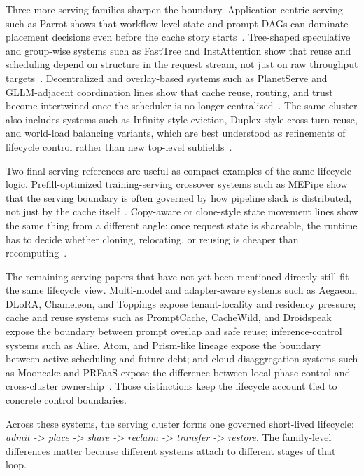 Three more serving families sharpen the boundary. Application-centric serving such as Parrot shows that workflow-level state and prompt DAGs can dominate placement decisions even before the cache story starts~\cite{lin2024parrot}. Tree-shaped speculative and group-wise systems such as FastTree and InstAttention show that reuse and scheduling depend on structure in the request stream, not just on raw throughput targets~\cite{pan2025fasttree,pan2025instattention}. Decentralized and overlay-based systems such as PlanetServe and GLLM-adjacent coordination lines show that cache reuse, routing, and trust become intertwined once the scheduler is no longer centralized~\cite{fang2026planetserve}. The same cluster also includes systems such as Infinity-style eviction, Duplex-style cross-turn reuse, and world-load balancing variants, which are best understood as refinements of lifecycle control rather than new top-level subfields~\cite{infinigen2024,yun2024duplex,wang2025wlbllm}.

Two final serving references are useful as compact examples of the same lifecycle logic. Prefill-optimized training-serving crossover systems such as MEPipe show that the serving boundary is often governed by how pipeline slack is distributed, not just by the cache itself~\cite{sun2025mepipe}. Copy-aware or clone-style state movement lines show the same thing from a different angle: once request state is shareable, the runtime has to decide whether cloning, relocating, or reusing is cheaper than recomputing~\cite{tian2025clone}.

The remaining serving papers that have not yet been mentioned directly still fit the same lifecycle view. Multi-model and adapter-aware systems such as Aegaeon, DLoRA, Chameleon, and Toppings expose tenant-locality and residency pressure; cache and reuse systems such as PromptCache, CacheWild, and Droidspeak expose the boundary between prompt overlap and safe reuse; inference-control systems such as Alise, Atom, and Prism-like lineage expose the boundary between active scheduling and future debt; and cloud-disaggregation systems such as Mooncake and PRFaaS expose the difference between local phase control and cross-cluster ownership~\cite{xiang2025aegaeon,wu2024dlora,iliakopoulou2024chameleon,li2025toppings,gim2024promptcache,wang2025kvcachewild,liu2026droidspeak,zhao2024alise,zhao2024atom,yu2025prism,qin2026prfaas}. Those distinctions keep the lifecycle account tied to concrete control boundaries.

Across these systems, the serving cluster forms one governed short-lived lifecycle: \emph{admit -> place -> share -> reclaim -> transfer -> restore}. The family-level differences matter because different systems attach to different stages of that loop.

